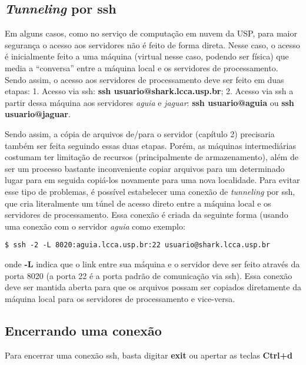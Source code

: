 \documentclass[]{article}
\begin{document}
\subsection{\texorpdfstring{\emph{Tunneling} por
ssh}{Tunneling por ssh}}\label{tunneling-por-ssh}

Em alguns casos, como no serviço de computação em nuvem da USP, para
maior segurança o acesso aos servidores não é feito de forma direta.
Nesse caso, o acesso é inicialmente feito a uma máquina (virtual nesse
caso, podendo ser física) que media a ``conversa'' entre a máquina local
e os servidores de processamento. Sendo assim, o acesso aos servidores
de processamento deve ser feito em duas etapas: 1. Acesso via ssh:
\textbf{ssh usuario@shark.lcca.usp.br}; 2. Acesso via ssh a partir dessa
máquina aos servidores \emph{aguia} e \emph{jaguar}: \textbf{ssh
usuario@aguia} ou \textbf{ssh usuario@jaguar}.

Sendo assim, a cópia de arquivos de/para o servidor (capítulo 2)
precisaria também ser feita seguindo essas duas etapas. Porém, as
máquinas intermediárias costumam ter limitação de recursos
(principalmente de armazenamento), além de ser um processo bastante
inconveniente copiar arquivos para um determinado lugar para em seguida
copiá-los novamente para uma nova localidade. Para evitar esse tipo de
problemas, é possível estabelecer uma conexão de \emph{tunneling} por
ssh, que cria literalmente um túnel de acesso direto entre a máquina
local e os servidores de processamento. Essa conexão é criada da
seguinte forma (usando uma conexão com o servidor \emph{aguia} como
exemplo:

\begin{verbatim}
$ ssh -2 -L 8020:aguia.lcca.usp.br:22 usuario@shark.lcca.usp.br
\end{verbatim}

onde \textbf{-L} indica que o link entre sua máquina e o servidor deve
ser feito através da porta 8020 (a porta 22 é a porta padrão de
comunicação via ssh). Essa conexão deve ser mantida aberta para que os
arquivos possam ser copiados diretamente da máquina local para os
servidores de processamento e vice-versa.

\subsection{Encerrando uma conexão}\label{encerrando-uma-conexao}

Para encerrar uma conexão ssh, basta digitar \textbf{exit} ou apertar as
teclas \textbf{Ctrl+d}
\end{document}
